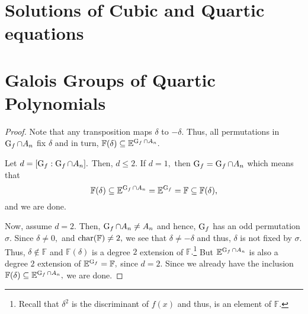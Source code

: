 \section{Solutions of Cubic and Quartic equations}

\section{Galois Groups of Quartic Polynomials}

\alternatingsubgroupdiscriminantroot*\label{thm:alternatingsubgroupdiscriminantroot2}
\begin{flushright}\hyperref[thm:alternatingsubgroupdiscriminantroot]{\upsym}\end{flushright}
\begin{proof}
    Note that any transposition maps $\delta$ to $-\delta.$ Thus, all permutations in $\operatorname{G}_f \cap A_n$ fix $\delta$ and in turn, $\mathbb{F}(\delta) \subseteq \mathbb{E}^{\operatorname{G}_f \cap A_n}.$

    Let $d = [\operatorname{G}_f : \operatorname{G}_f \cap A_n].$ Then, $d \le 2.$ If $d = 1,$ then $\operatorname{G}_f = \operatorname{G}_f \cap A_n$ which means that
    \begin{equation*} 
        \mathbb{F}(\delta) \subseteq \mathbb{E}^{\operatorname{G}_f \cap A_n} = \mathbb{E}^{\operatorname{G}_f} = \mathbb{F} \subseteq \mathbb{F}(\delta),
    \end{equation*}
    and we are done.

    Now, assume $d = 2.$ Then, $\operatorname{G}_f \cap A_n \neq A_n$ and hence, $\operatorname{G}_f$ has an odd permutation $\sigma.$ Since $\delta \neq 0,$ and $\operatorname{char}(\mathbb{F}) \neq 2,$ we see that $\delta \neq -\delta$ and thus, $\delta$ is not fixed by $\sigma.$ Thus, $\delta \notin \mathbb{F}$ and $\mathbb{F}(\delta)$ is a degree $2$ extension of $\mathbb{F}.$\footnote{Recall that $\delta^2$ is the discriminant of $f(x)$ and thus, is an element of $\mathbb{F}.$ } But $\mathbb{E}^{\operatorname{G}_f \cap A_n}$ is also a degree $2$ extension of $\mathbb{E}^{\operatorname{G}_f} = \mathbb{F},$ since $d = 2.$ Since we already have the inclusion $\mathbb{F}(\delta) \subseteq \mathbb{E}^{\operatorname{G}_f \cap A_n},$ we are done.
\end{proof}

